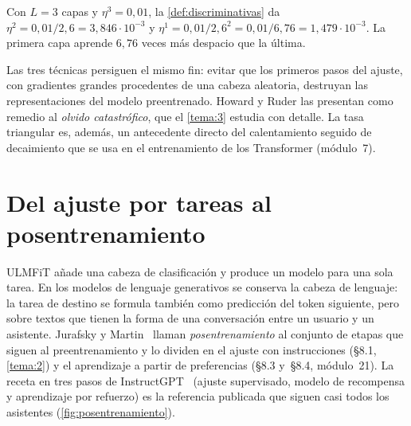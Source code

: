 \begin{ejemplo}\label{ej:discriminativas}
Con $L=3$ capas y $\eta^{3}=0{,}01$, la \cref{def:discriminativas} da $\eta^{2}=0{,}01/2{,}6=3{,}846\cdot 10^{-3}$ y $\eta^{1}=0{,}01/2{,}6^{2}=0{,}01/6{,}76=1{,}479\cdot 10^{-3}$. La primera capa aprende $6{,}76$ veces más despacio que la última.
\end{ejemplo}

\begin{observacion}
Las tres técnicas persiguen el mismo fin: evitar que los primeros pasos del ajuste, con gradientes grandes procedentes de una cabeza aleatoria, destruyan las representaciones del modelo preentrenado. Howard y Ruder las presentan como remedio al \emph{olvido catastrófico}, que el \cref{tema:3} estudia con detalle. La tasa triangular es, además, un antecedente directo del calentamiento seguido de decaimiento que se usa en el entrenamiento de los Transformer (módulo~7).
\end{observacion}

\section{Del ajuste por tareas al posentrenamiento}

ULMFiT añade una cabeza de clasificación y produce un modelo para una sola tarea. En los modelos de lenguaje generativos se conserva la cabeza de lenguaje: la tarea de destino se formula también como predicción del token siguiente, pero sobre textos que tienen la forma de una conversación entre un usuario y un asistente. Jurafsky y Martin~\cite[cap.~8]{jm3} llaman \emph{posentrenamiento} al conjunto de etapas que siguen al preentrenamiento y lo dividen en el ajuste con instrucciones (§8.1, \cref{tema:2}) y el aprendizaje a partir de preferencias (§8.3 y~§8.4, módulo~21). La receta en tres pasos de InstructGPT~\cite{ouyang} (ajuste supervisado, modelo de recompensa y aprendizaje por refuerzo) es la referencia publicada que siguen casi todos los asistentes (\cref{fig:posentrenamiento}).

